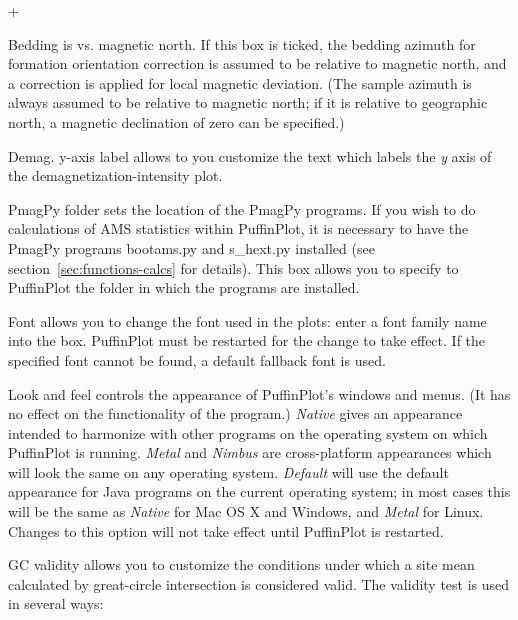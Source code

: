 \documentclass[a4paper,british]{article}
\newcommand{\menuitemlabel}[1]{%
\mbox{\textsf{#1}}\hfil}
\newenvironment{menuitemlist}%
{\begin{list}{}{%
\renewcommand{\makelabel}{\menuitemlabel}%
\setlength{\labelwidth}{35pt}%
\setlength{\leftmargin}%
             {\labelwidth+\labelsep}}}%
{\end{list}}
\newcommand{\ppcmd}[1]{\textsf{#1}} %
\newcommand{\caps}[1]{\MakeTextUppercase{#1}} %
\begin{document}
\begin{menuitemlist}
\item[Bedding is vs. magnetic north.] If this box is ticked, the bedding
  azimuth for formation orientation correction is assumed to be relative to
  magnetic north, and a correction is applied for local magnetic deviation.
  (The sample azimuth is always assumed to be relative to magnetic north; if
  it is relative to geographic north, a magnetic declination of zero can be
  specified.)

\item[Demag. y-axis label] allows to you customize the text which labels the
  {\em y} axis of the demagnetization-intensity plot.

\item[PmagPy folder] sets the location of the PmagPy programs. If you wish to
  do calculations of \caps{ams} statistics within PuffinPlot, it is necessary
  to have the PmagPy programs \ppcmd{bootams.py} and \ppcmd{s\_hext.py}
  installed (see section~\ref{sec:functions-calcs} for details). This
  box allows you to specify to PuffinPlot the folder in which the programs
  are installed.

\item[Font] allows you to change the font used in the plots: enter a font
  family name into the box. PuffinPlot must be restarted for the change to
  take effect. If the specified font cannot be found, a default fallback font
  is used.

\item[Look and feel] controls the appearance of PuffinPlot's windows and
  menus. (It has no effect on the functionality of the program.)
  \textit{Native} gives an appearance intended to harmonize with other
  programs on the operating system on which PuffinPlot is running.
  \textit{Metal} and \textit{Nimbus} are cross-platform appearances which
  will look the same on any operating system. \textit{Default} will use the
  default appearance for Java programs on the current operating system; in
  most cases this will be the same as \textit{Native} for Mac OS X and
  Windows, and \textit{Metal} for Linux. Changes to this option will
  not take effect until PuffinPlot is restarted.

\item[GC validity] allows you to customize the conditions under which a site
  mean calculated by great-circle intersection is considered valid. The
  validity test is used in several ways:

  \begin{itemize}


\end{itemize}
\end{menuitemlist}
\end{document}
